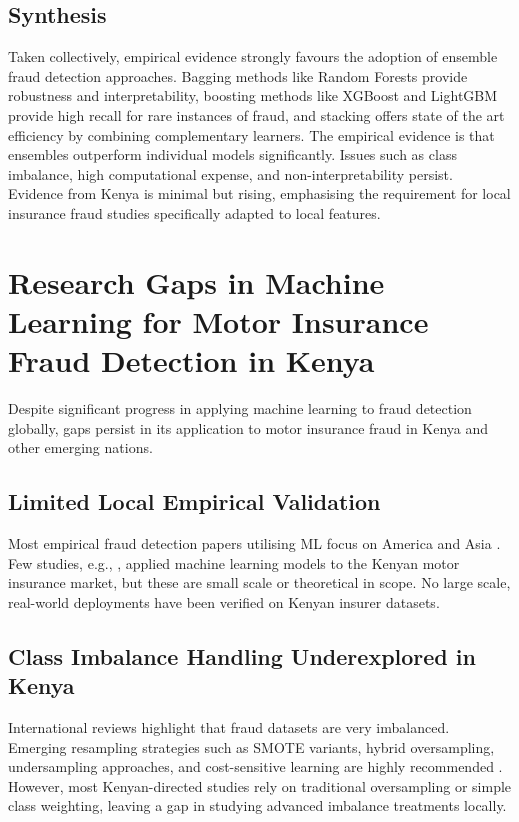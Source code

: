 \documentclass[12pt,a4paper,oneside]{report}
\numberwithin{equation}{chapter}
\begin{document}
\subsection{Synthesis}

Taken collectively, empirical evidence strongly favours the adoption of ensemble fraud detection
approaches. Bagging methods like Random Forests provide robustness and interpretability, boosting
methods like XGBoost and LightGBM provide high recall for rare instances of fraud, and stacking
offers state of the art efficiency by combining complementary learners. The empirical evidence is
that ensembles outperform individual models significantly. Issues such as class imbalance, high
computational expense, and non-interpretability persist. Evidence from Kenya is minimal but
rising, emphasising the requirement for local insurance fraud studies specifically adapted to
local features.

\section{Research Gaps in Machine Learning for Motor Insurance Fraud Detection in Kenya}

Despite significant progress in applying machine learning to fraud detection globally, gaps persist
in its application to motor insurance fraud in Kenya and other emerging nations.

\subsection{Limited Local Empirical Validation}

Most empirical fraud detection papers utilising ML focus on America and Asia
\cite{ashtiani2021intelligent,schrijver2024automobile,Khalid2024}. Few studies, e.g.,
\cite{njeru2022detection}, applied machine learning models to the Kenyan motor insurance market,
but these are small scale or theoretical in scope. No large scale, real-world deployments have
been verified on Kenyan insurer datasets.

\subsection{Class Imbalance Handling Underexplored in Kenya}

International reviews highlight that fraud datasets are very imbalanced. Emerging resampling
strategies such as SMOTE variants, hybrid oversampling, undersampling approaches, and
cost-sensitive learning are highly recommended \cite{Eteng2025,zhang2024fraud,Ming2024}. However,
most Kenyan-directed studies rely on traditional oversampling or simple class weighting, leaving
a gap in studying advanced imbalance treatments locally.
\end{document}
